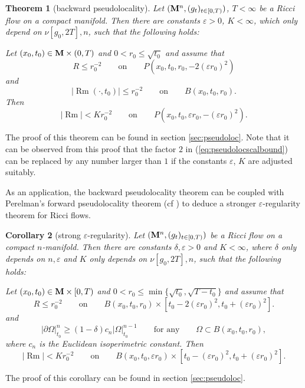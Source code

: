 \documentclass[11pt]{amsart}
\numberwithin{equation}{section}
\newtheorem{theorem}{Theorem}[section]
\newtheorem{corollary}[theorem]{Corollary}
\def\eps{\varepsilon}
\def\M{{\bf M}}
\def\eps{\varepsilon}
\def\p{\partial}
\DeclareMathOperator{\Rm}{Rm}
\numberwithin{equation}{section}
\begin{document}
\begin{theorem}[backward pseudolocality] \label{Thm:backwpseudoloc} \label{thbackcurv}
Let $(\M^n, (g_t)_{t \in [0,T)})$, $T < \infty$ be a Ricci flow on a compact manifold.
Then there are constants $\varepsilon > 0$, $K < \infty$, which only depend on $\nu [ g_0, 2T ], n$, such that the following holds:

Let $(x_0, t_0) \in \M \times (0, T)$ and $0 < r_0 \leq  \sqrt{t_0}$ and assume that
\begin{equation} \label{eq:pseudolocscalbound}
 R \leq r_0^{-2} \qquad \text{on} \qquad P(x_0, t_0, r_0, - 2 (\varepsilon r_0)^2) 
\end{equation}
and
\[ |{\Rm} (\cdot, t_0)| \leq r_0^{-2} \qquad \text{on} \qquad B(x_0,t_0,r_0). \]
Then
\[ |{\Rm}| < K r_0^{-2} \qquad \text{on} \qquad P(x_0,t_0,\varepsilon r_0, - (\varepsilon r_0)^2). \]
\end{theorem}
The proof of this theorem can be found in section \ref{sec:pseudoloc}.
Note that it can be observed from this proof that the factor $2$ in (\ref{eq:pseudolocscalbound}) can be replaced by any number larger than $1$ if the constants $\varepsilon$, $K$ are adjusted suitably.

As an application, the backward pseudolocality theorem can be coupled with Perelman's forward pseudolocality theorem (cf \cite{P:1}) to deduce a stronger $\eps$-regularity theorem for Ricci flows. 

\begin{corollary}[strong $\eps$-regularity] \label{costrongreg}
Let $(\M^n, (g_t)_{t \in [0,T)})$ be a Ricci flow on a compact $n$-manifold.
Then there are constants $\delta, \varepsilon > 0$ and $K < \infty$, where $\delta$ only depends on $n, \varepsilon$ and $K$ only depends on $\nu[g_0, 2T], n$, such that the following holds:

Let $(x_0, t_0) \in \M \times [0, T)$ and $0 < r_0 \leq \min \{  \sqrt{t_0}, \sqrt{T-t_0} \}$ and assume that
\[ R \leq r_0^{-2} \qquad \text{on} \qquad B(x_0, t_0, r_0) \times [t_0 - 2(\varepsilon r_0)^2, t_0 + (\varepsilon r_0)^2]. \]
and
\[ |\p \Omega|_{t_0}^n \ge (1-\delta) c_n |\Omega|_{t_0}^{n-1} \qquad \text{for any} \qquad\Omega \subset  B(x_0,t_0,r_0), \]
where $c_n$ is the Euclidean isoperimetric constant.
Then
\[ |{\Rm}| < K r_0^{-2} \qquad \text{on} \qquad
 B(x_0,t_0, \varepsilon r_0 ) \times [ t_0-  (\varepsilon r_0)^2, t_0 + (\varepsilon r_0)^2].  \]
\end{corollary}
The proof of this corollary can be found in section \ref{sec:pseudoloc}.
\end{document}
